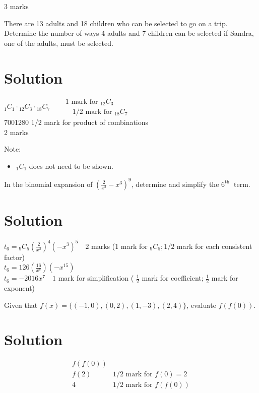 \documentclass[10pt]{article}
\begin{document}
3 marks

There are 13 adults and 18 children who can be selected to go on a trip. Determine the number of ways 4 adults and 7 children can be selected if Sandra, one of the adults, must be selected.

\section*{Solution}
${ }_{1} C_{1} \cdot{ }_{12} C_{3} \cdot{ }_{18} C_{7} \quad \begin{aligned} & 1 \text { mark for }{ }_{12} C_{3} \\ & \quad 1 / 2 \text { mark for }{ }_{18} C_{7}\end{aligned}$\\
7001280 1/2 mark for product of combinations\\
2 marks

Note:

\begin{itemize}
  \item ${ }_{1} C_{1}$ does not need to be shown.
\end{itemize}

In the binomial expansion of $\left(\frac{2}{x^{2}}-x^{3}\right)^{9}$, determine and simplify the $6^{\text {th }}$ term.

\section*{Solution}
$t_{6}={ }_{9} C_{5}\left(\frac{2}{x^{2}}\right)^{4}\left(-x^{3}\right)^{5} \quad 2$ marks (1 mark for ${ }_{9} C_{5} ; 1 / 2$ mark for each consistent factor)\\
$t_{6}=126\left(\frac{16}{x^{8}}\right)\left(-x^{15}\right)$\\
$t_{6}=-2016 x^{7} \quad 1$ mark for simplification ( $\frac{1}{2}$ mark for coefficient; $\frac{1}{2}$ mark for exponent)

Given that $f(x)=\{(-1,0),(0,2),(1,-3),(2,4)\}$, evaluate $f(f(0))$.

\section*{Solution}
$$
\begin{array}{ll}
f(f(0)) & \\
f(2) & 1 / 2 \text { mark for } f(0)=2 \\
4 & 1 / 2 \text { mark for } f(f(0))
\end{array}
$$
\end{document}
